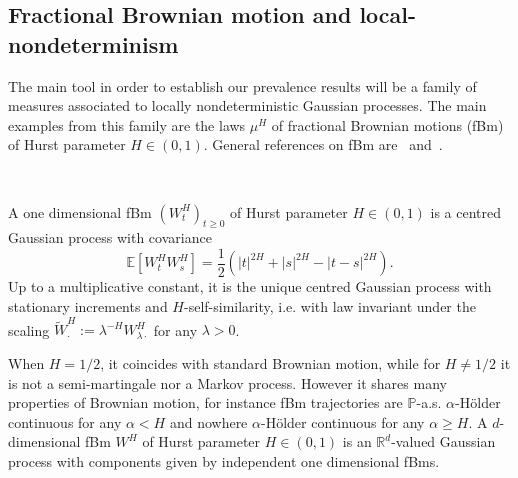 \documentclass[10pt]{article}
\newcommand{\assign}{:=}
\begin{document}
\subsection{Fractional Brownian motion and
local\mbox{-}nondeterminism}\label{sec2.4}

The main tool in order to establish our prevalence results will be a family of
measures associated to locally nondeterministic Gaussian processes. The main
examples from this family are the laws $\mu^H$ of fractional Brownian motions
(fBm) of Hurst parameter $H \in (0, 1)$. General references on fBm
are~{\cite{nualart2006}} and~{\cite{picard}}.

\

A one dimensional fBm $(W^H_t)_{t \geqslant 0}$ of Hurst parameter $H \in (0,
1)$ is a centred Gaussian process with covariance
\[ \mathbb{E} [W^H_t W^H_s] = \frac{1}{2} (| t |^{2 H} + | s |^{2 H} - | t - s
   |^{2 H}) . \]
Up to a multiplicative constant, it is the unique centred Gaussian process
with stationary increments and $H$\mbox{-}self-similarity, i.e. with law
invariant under the scaling $\tilde{W}^H_{\cdot} \assign \lambda^{- H}
W^H_{\lambda \cdot}$ for any $\lambda > 0$.

When $H = 1 / 2$, it coincides with standard Brownian motion, while for $H
\neq 1 / 2$ it is not a semi-martingale nor a Markov process. However it
shares many properties of Brownian motion, for instance fBm trajectories are
$\mathbb{P}$-a.s. $\alpha$-H{\"o}lder continuous for any $\alpha < H$ and
nowhere $\alpha$-H{\"o}lder continuous for any $\alpha \geqslant H$. A
$d$-dimensional fBm $W^H$ of Hurst parameter $H \in (0, 1)$ is an
$\mathbb{R}^d$\mbox{-}valued Gaussian process with components given by
independent one dimensional fBms.

\
\end{document}
